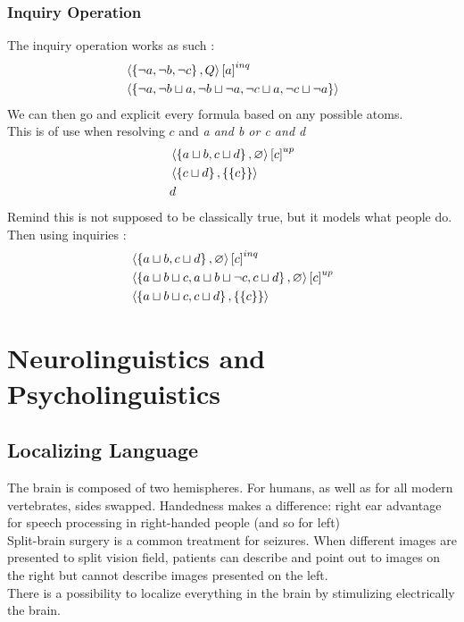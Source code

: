 \documentclass{cours}
\begin{document}
\subsubsection{Inquiry Operation}

The inquiry operation works as such :
\[
    \begin{aligned}
         & \left\langle \left\{\lnot a, \lnot b, \lnot c\right\}, Q \right\rangle\left[a\right]^{inq}                                            \\
         & \left\langle \left\{\lnot a, \lnot b \sqcup a, \lnot b \sqcup \lnot a, \lnot c \sqcup a, \lnot c \sqcup \lnot a\right\} \right\rangle
    \end{aligned}
\]
We can then go and explicit every formula based on any possible atoms. \\
This is of use when resolving $c$ and \textsl{a and b or c and d}
\[
    \begin{aligned}
         & \left\langle \left\{a \sqcup b, c \sqcup d\right\}, \varnothing \right\rangle\left[c\right]^{up} \\
         & \left\langle \left\{c \sqcup d\right\}, \left\{\{c\}\right\} \right\rangle                     \\
         & d
    \end{aligned}
\]
Remind this is not supposed to be classically true, but it models what people do. Then using inquiries :
\[
    \begin{aligned}
         & \left\langle \left\{a \sqcup b, c \sqcup d\right\}, \varnothing \right\rangle\left[c\right]^{inq}                                    \\
         & \left\langle \left\{a \sqcup b \sqcup c, a \sqcup b \sqcup \lnot c, c \sqcup d\right\}, \varnothing \right\rangle\left[c\right]^{up} \\
         & \left\langle \left\{a \sqcup b \sqcup c, c \sqcup d\right\}, \left\{\left\{c\right\}\right\} \right\rangle
    \end{aligned}
\]

\section[Class 11\!: 14/12]{Neurolinguistics and Psycholinguistics}
\subsection{Localizing Language}
The brain is composed of two hemispheres. For humans, as well as for all modern vertebrates, sides swapped. Handedness makes a difference: right ear advantage for speech processing in right-handed people (and so for left)\\
Split-brain surgery is a common treatment for seizures. When different images are presented to split vision field, patients can describe and point out to images on the right but cannot describe images presented on the left.\\
There is a possibility to localize everything in the brain by stimulizing electrically the brain.
\end{document}
